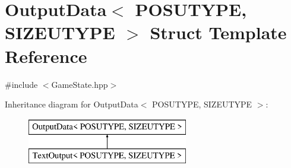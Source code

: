 \hypertarget{struct_output_data}{\section{Output\-Data$<$ P\-O\-S\-U\-T\-Y\-P\-E, S\-I\-Z\-E\-U\-T\-Y\-P\-E $>$ Struct Template Reference}
\label{struct_output_data}
}


{\ttfamily \#include $<$Game\-State.\-hpp$>$}

Inheritance diagram for Output\-Data$<$ P\-O\-S\-U\-T\-Y\-P\-E, S\-I\-Z\-E\-U\-T\-Y\-P\-E $>$\-:\begin{figure}[H]
\begin{center}
\leavevmode
\includegraphics[height=2.000000cm]{struct_output_data}
\end{center}
\end{figure}
